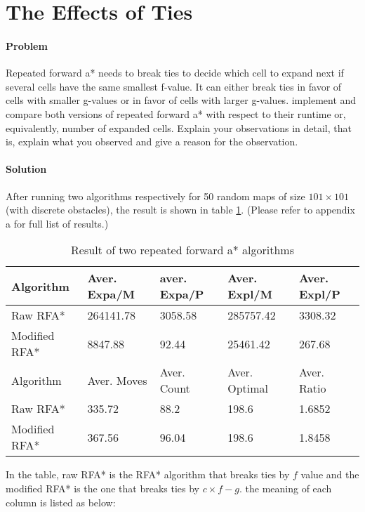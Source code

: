 \section{The Effects of Ties}

\paragraph{Problem} 
Repeated forward a* needs to break ties to decide which cell to expand next if
several cells have the same smallest f-value. It can either break ties in favor
of cells with smaller g-values or in favor of cells with larger g-values.
implement and compare both versions of repeated forward a* with respect to
their runtime or, equivalently, number of expanded cells. Explain your
observations in detail, that is, explain what you observed and give a reason
for the observation.

\paragraph{Solution} 
After running two algorithms respectively for 50 random maps of size $101\times
101$ (with discrete obstacles), the result is shown in table \ref{tbl:two-rpa}.
(Please refer to appendix a for full list of results.)

\begin{table}[h!]
\centering
\caption{Result of two repeated forward a* algorithms}
\begin{tabular}{|l|l|l|l|l|}
\hline
Algorithm & Aver. Expa/M & aver. Expa/P & Aver. Expl/M & Aver. Expl/P \\
\hline
Raw RFA* & 264141.78 & 3058.58 & 285757.42 & 3308.32 \\
\hline
Modified RFA* & 8847.88 & 92.44 & 25461.42 & 267.68 \\
\hhline{|=|=|=|=|=|}
Algorithm & Aver. Moves & Aver. Count & Aver. Optimal & Aver. Ratio \\
\hline
Raw RFA* & 335.72 & 88.2 & 198.6 & 1.6852 \\
\hline
Modified RFA* & 367.56 & 96.04 & 198.6 & 1.8458 \\
\hline
\end{tabular}
\label{tbl:two-rpa}
\end{table}

In the table, raw RFA* is the RFA* algorithm that breaks ties by $f$ value and
the modified RFA* is the one that breaks ties by $c\times f-g$. the meaning of
each column is listed as below:

